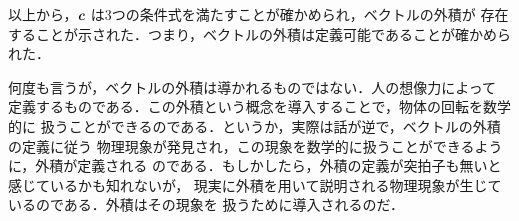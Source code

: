                 以上から，$\boldsymbol{c}$ は3つの条件式を満たすことが確かめられ，ベクトルの外積が
                存在することが示された．つまり，ベクトルの外積は定義可能であることが確かめられた．

                何度も言うが，ベクトルの外積は導かれるものではない．人の想像力によって
                定義するものである．この外積という概念を導入することで，物体の回転を数学的に
                扱うことができるのである．というか，実際は話が逆で，ベクトルの外積の定義に従う
                物理現象が発見され，この現象を数学的に扱うことができるように，外積が定義される
                のである．もしかしたら，外積の定義が突拍子も無いと感じているかも知れないが，
                現実に外積を用いて説明される物理現象が生じているのである．外積はその現象を
                扱うために導入されるのだ．

